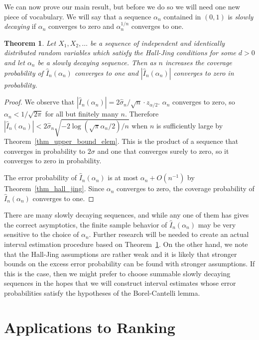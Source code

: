 \documentclass[12pt]{article}
\newtheorem{theorem}{Theorem}
\numberwithin{theorem}{section}
\begin{document}
We can now prove our main result, but before we do so we will need one new piece of vocabulary.  We will say that a sequence $\alpha_n$ contained in $(0, 1)$ is \emph{slowly decaying} if $\alpha_n$ converges to zero and $\alpha_n^{1 / n}$ converges to one.

\begin{theorem}
\label{thm_sci}
Let $X_1, X_2, \dots$ be a sequence of independent and identically distributed random variables which satisfy the Hall-Jing conditions for some $d > 0$ and let $\alpha_n$ be a slowly decaying sequence.  Then as $n$ increases the coverage probability of $\hat{I}_n(\alpha_n)$ converges to one and $|\hat{I}_n(\alpha_n)|$ converges to zero in probability.
\end{theorem}
\begin{proof}
We observe that $|\hat{I}_n(\alpha_n)| = 2\hat{\sigma}_n / \sqrt{n} \cdot z_{\alpha / 2}$.  $\alpha_n$ converges to zero, so $\alpha_n < 1 / \sqrt{2\pi}$ for all but finitely many $n$.  Therefore $|\hat{I}_n(\alpha_n)| < 2\hat{\sigma}_n \sqrt{ -2\log(\sqrt{\pi}\alpha_n / 2) / n}$ when $n$ is sufficiently large by Theorem~\ref{thm_upper_bound_elem}.  This is the product of a sequence that converges in probability to $2\sigma$ and one that converges surely to zero, so it converges to zero in probability.

The error probability of $\hat{I}_n(\alpha_n)$ is at most $\alpha_n + O(n^{-1})$ by Theorem~\ref{thm_hall_jing}.  Since $\alpha_n$ converges to zero, the coverage probability of $\hat{I}_n(\alpha_n)$ converges to one.
\end{proof}

There are many slowly decaying sequences, and while any one of them has gives the correct asymptotics, the finite sample behavior of $\hat{I}_n(\alpha_n)$ may be very sensitive to the choice of $\alpha_n$.  Further research will be needed to create an actual interval estimation procedure based on Theorem~\ref{thm_sci}.  On the other hand, we note that the Hall-Jing assumptions are rather weak and it is likely that stronger bounds on the excess error probability can be found with stronger assumptions.  If this is the case, then we might prefer to choose summable slowly decaying sequences in the hopes that we will construct interval estimates whose error probabilities satisfy the hypotheses of the Borel-Cantelli lemma.

\section{Applications to Ranking}
\label{sec_rank}
\end{document}
